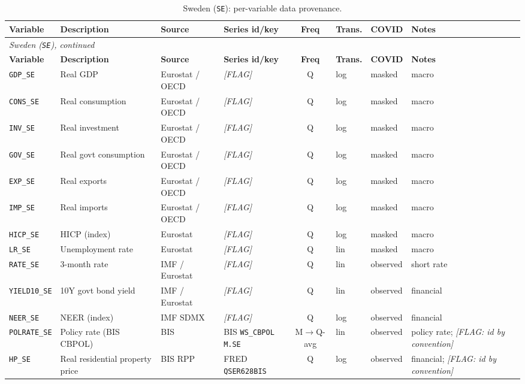 {\small
\begin{longtable}{@{}lp{2.9cm}p{1.9cm}p{2.0cm}cp{1.4cm}p{1.7cm}p{2.6cm}@{}}
\caption{Sweden (\texttt{SE}): per-variable data provenance.}\label{tab:data:SE}\\
\toprule
\textbf{Variable} & \textbf{Description} & \textbf{Source} & \textbf{Series id/key} & \textbf{Freq} & \textbf{Trans.} & \textbf{COVID} & \textbf{Notes}\\
\midrule
\endfirsthead
\multicolumn{8}{l}{\small\itshape Sweden (\texttt{SE}), continued}\\
\toprule
\textbf{Variable} & \textbf{Description} & \textbf{Source} & \textbf{Series id/key} & \textbf{Freq} & \textbf{Trans.} & \textbf{COVID} & \textbf{Notes}\\
\midrule
\endhead
\bottomrule
\endfoot
\texttt{GDP\_SE} & Real GDP & Eurostat / OECD & \textit{[FLAG]} & Q & log & masked & macro\\
\texttt{CONS\_SE} & Real consumption & Eurostat / OECD & \textit{[FLAG]} & Q & log & masked & macro\\
\texttt{INV\_SE} & Real investment & Eurostat / OECD & \textit{[FLAG]} & Q & log & masked & macro\\
\texttt{GOV\_SE} & Real govt consumption & Eurostat / OECD & \textit{[FLAG]} & Q & log & masked & macro\\
\texttt{EXP\_SE} & Real exports & Eurostat / OECD & \textit{[FLAG]} & Q & log & masked & macro\\
\texttt{IMP\_SE} & Real imports & Eurostat / OECD & \textit{[FLAG]} & Q & log & masked & macro\\
\texttt{HICP\_SE} & HICP (index) & Eurostat & \textit{[FLAG]} & Q & log & masked & macro\\
\texttt{LR\_SE} & Unemployment rate & Eurostat & \textit{[FLAG]} & Q & lin & masked & macro\\
\texttt{RATE\_SE} & 3-month rate & IMF / Eurostat & \textit{[FLAG]} & Q & lin & observed & short rate\\
\texttt{YIELD10\_SE} & 10Y govt bond yield & IMF / Eurostat & \textit{[FLAG]} & Q & lin & observed & financial\\
\texttt{NEER\_SE} & NEER (index) & IMF SDMX & \textit{[FLAG]} & Q & log & observed & financial\\
\texttt{POLRATE\_SE} & Policy rate (BIS CBPOL) & BIS & BIS \texttt{WS\_CBPOL} \texttt{M.SE} & M$\to$Q-avg & lin & observed & policy rate; \textit{[FLAG: id by convention]}\\
\texttt{HP\_SE} & Real residential property price & BIS RPP & FRED \texttt{QSER628BIS} & Q & log & observed & financial; \textit{[FLAG: id by convention]}\\

\end{longtable}}
